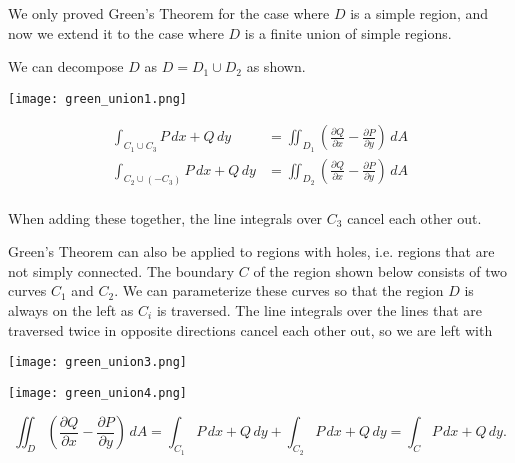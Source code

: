 \documentclass[11pt,oneside,english]{amsart}
\theoremstyle{definition}
\newcommand{\pp}[2]{\frac{\partial{#1}}{\partial{#2}}}
\begin{document}
We only proved Green's Theorem for the case where $D$ is a simple region, and now we extend it to the case where $D$ is a finite union of simple regions. 

We can decompose $D$ as $D=D_1 \cup D_2$ as shown.

\begin{multicols}{2}
\begin{center}
\texttt{[image: green\_union1.png]}
\end{center}

\begin{align*}
\int_{C_1\cup C_3}P\,dx+Q\,dy&=\iint_{D_1}\left(\pp{Q}{x}-\pp{P}{y}\right)\,dA\\[2mm]
\int_{C_2\cup (-C_3)}P\,dx+Q\,dy&=\iint_{D_2}\left(\pp{Q}{x}-\pp{P}{y}\right)\,dA\\
\end{align*}

\end{multicols}

When adding these together, the line integrals over $C_3$ cancel each other out.

\pagebreak

Green's Theorem can also be applied to regions with holes, i.e. regions that are not simply connected. The boundary $C$ of the region shown below consists of two curves $C_1$ and $C_2$. We can parameterize these curves so that the region $D$ is always on the left as $C_i$ is traversed. The line integrals over the lines that are traversed twice in opposite directions cancel each other out, so we are left with


\begin{minipage}{0.5\textwidth}
\begin{center}
\texttt{[image: green\_union3.png]}
\end{center}
\end{minipage}%
\begin{minipage}{0.5\textwidth}
\begin{center}
\texttt{[image: green\_union4.png]}
\end{center}
\end{minipage}


\[
\iint_D\left(\pp{Q}{x}-\pp{P}{y}\right)\,dA=\int_{C_1}P\,dx+Q\,dy+\int_{C_2}P\,dx+Q\,dy=\int_CP\,dx+Q\,dy.
\]
\end{document}
